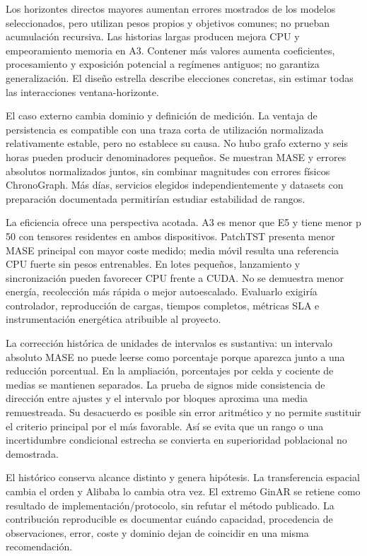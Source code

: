 Los horizontes directos mayores aumentan errores mostrados de los modelos seleccionados, pero utilizan pesos propios y objetivos comunes; no prueban acumulación recursiva. Las historias largas producen mejora CPU y empeoramiento memoria en A3. Contener más valores aumenta coeficientes, procesamiento y exposición potencial a regímenes antiguos; no garantiza generalización. El diseño estrella describe elecciones concretas, sin estimar todas las interacciones ventana-horizonte.

El caso externo cambia dominio y definición de medición. La ventaja de persistencia es compatible con una traza corta de utilización normalizada relativamente estable, pero no establece su causa. No hubo grafo externo y seis horas pueden producir denominadores pequeños. Se muestran MASE y errores absolutos normalizados juntos, sin combinar magnitudes con errores físicos ChronoGraph. Más días, servicios elegidos independientemente y datasets con preparación documentada permitirían estudiar estabilidad de rangos.

La eficiencia ofrece una perspectiva acotada. A3 es menor que E5 y tiene menor p 50 con tensores residentes en ambos dispositivos. PatchTST presenta menor MASE principal con mayor coste medido; media móvil resulta una referencia CPU fuerte sin pesos entrenables. En lotes pequeños, lanzamiento y sincronización pueden favorecer CPU frente a CUDA. No se demuestra menor energía, recolección más rápida o mejor autoescalado. Evaluarlo exigiría controlador, reproducción de cargas, tiempos completos, métricas SLA e instrumentación energética atribuible al proyecto.

La corrección histórica de unidades de intervalos es sustantiva: un intervalo absoluto MASE no puede leerse como porcentaje porque aparezca junto a una reducción porcentual. En la ampliación, porcentajes por celda y cociente de medias se mantienen separados. La prueba de signos mide consistencia de dirección entre ajustes y el intervalo por bloques aproxima una media remuestreada. Su desacuerdo es posible sin error aritmético y no permite sustituir el criterio principal por el más favorable. Así se evita que un rango o una incertidumbre condicional estrecha se convierta en superioridad poblacional no demostrada.

El histórico conserva alcance distinto y genera hipótesis. La transferencia espacial cambia el orden y Alibaba lo cambia otra vez. El extremo GinAR se retiene como resultado de implementación/protocolo, sin refutar el método publicado. La contribución reproducible es documentar cuándo capacidad, procedencia de observaciones, error, coste y dominio dejan de coincidir en una misma recomendación.

